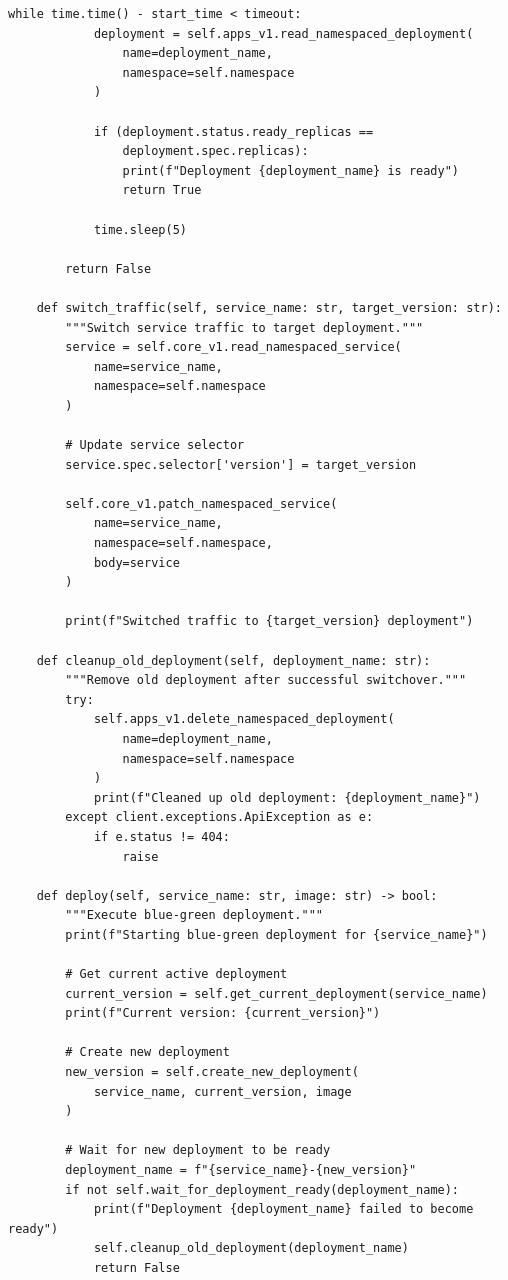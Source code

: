 \begin{lstlisting}[style=python, caption=scripts/blue_green_deploy.py]
        while time.time() - start_time < timeout:
            deployment = self.apps_v1.read_namespaced_deployment(
                name=deployment_name,
                namespace=self.namespace
            )

            if (deployment.status.ready_replicas ==
                deployment.spec.replicas):
                print(f"Deployment {deployment_name} is ready")
                return True

            time.sleep(5)

        return False

    def switch_traffic(self, service_name: str, target_version: str):
        """Switch service traffic to target deployment."""
        service = self.core_v1.read_namespaced_service(
            name=service_name,
            namespace=self.namespace
        )

        # Update service selector
        service.spec.selector['version'] = target_version

        self.core_v1.patch_namespaced_service(
            name=service_name,
            namespace=self.namespace,
            body=service
        )

        print(f"Switched traffic to {target_version} deployment")

    def cleanup_old_deployment(self, deployment_name: str):
        """Remove old deployment after successful switchover."""
        try:
            self.apps_v1.delete_namespaced_deployment(
                name=deployment_name,
                namespace=self.namespace
            )
            print(f"Cleaned up old deployment: {deployment_name}")
        except client.exceptions.ApiException as e:
            if e.status != 404:
                raise

    def deploy(self, service_name: str, image: str) -> bool:
        """Execute blue-green deployment."""
        print(f"Starting blue-green deployment for {service_name}")

        # Get current active deployment
        current_version = self.get_current_deployment(service_name)
        print(f"Current version: {current_version}")

        # Create new deployment
        new_version = self.create_new_deployment(
            service_name, current_version, image
        )

        # Wait for new deployment to be ready
        deployment_name = f"{service_name}-{new_version}"
        if not self.wait_for_deployment_ready(deployment_name):
            print(f"Deployment {deployment_name} failed to become ready")
            self.cleanup_old_deployment(deployment_name)
            return False


\end{lstlisting}
